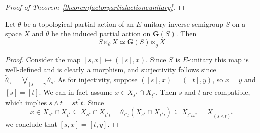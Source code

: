\begin{proof}[Proof of Theorem~\ref{theoremfactorpartialactioneunitary}]

%

\end{proof}


\begin{proposition}\label{prop:eunitarygroupoidofgerms}
Let $\theta$ be a topological partial action of an $E$-unitary inverse semigroup $S$ on a space $X$ and $\widetilde{\theta}$ be the induced partial action on $\mathbf{G}(S)$. Then
\[S\ltimes_\theta X\simeq \mathbf{G}(S)\ltimes_{\widetilde{\theta}} X\]
\end{proposition}
\begin{proof}
Consider the map $[s,x]\mapsto ([s],x)$. Since $S$ is $E$-unitary this map is well-defined and is clearly a morphism, and surjectivity follows since $\widetilde{\theta}_{\gamma}=\bigvee_{[s]=\gamma}\theta_s$. As for injectivity, suppose $([s],x)=([t],y)$, so $x=y$ and $[s]=[t]$. We can in fact assume $x\in X_{s^*}\cap X_{t^*}$. Then $s$ and $t$ are compatible, which implies $s\land t=st^*t$. Since
\[x\in X_{s^*}\cap X_{t^*}\subseteq X_{s^*}\cap X_{t^*t}=\theta_{t^*t}(X_{s^*}\cap X_{t^*t})\subseteq X_{t^*ts^*}=X_{(s\land t)^*}\]
we conclude that $[s,x]=[t,y]$.\qedhere
\end{proof}


